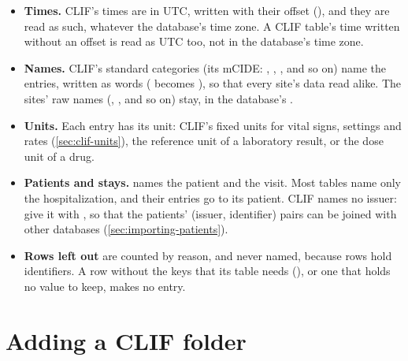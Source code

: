 \begin{itemize}
\item \textbf{Times.} CLIF's times are in UTC, written with their offset
  (), and they are read as such, whatever the database's time
  zone. A CLIF table's time written without an offset is read as UTC too, not in the database's
  time zone.
\item \textbf{Names.} CLIF's standard categories (its mCIDE: ,
  , ,  and so on) name the
  entries, written as words ( becomes ), so that every site's
  data read alike. The sites' raw names (, , 
  and so on) stay, in the database's .
\item \textbf{Units.} Each entry has its unit: CLIF's fixed units for vital signs, settings and
  rates (\cref{sec:clif-units}), the reference unit of a laboratory result, or the dose unit of a
  drug.
\item \textbf{Patients and stays.}  names the patient and
   the visit. Most tables name only the hospitalization, and their
  entries go to its patient. CLIF names no issuer: give it with , so that the
  patients' (issuer, identifier) pairs can be joined with other databases
  (\cref{sec:importing-patients}).
\item \textbf{Rows left out} are counted by reason, and never named, because rows hold
  identifiers. A row without the keys that its table needs (), or one that holds no value to keep, makes no entry.
\end{itemize}

\section{Adding a CLIF folder}
\label{sec:clif-importing}

